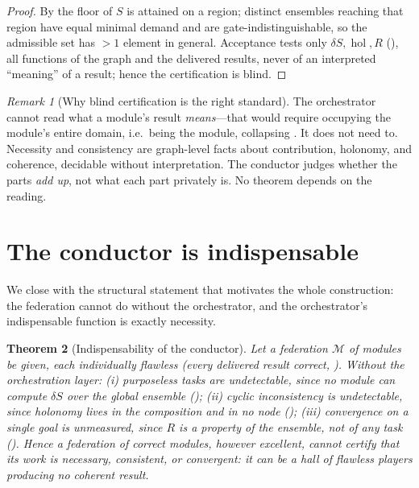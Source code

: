 \documentclass[twocolumn,11pt,a4paper]{article}
\theoremstyle{sup}
\newtheorem{theorem}{Theorem}[section]
\theoremstyle{definition}
\theoremstyle{remark}
\newtheorem{remark}[theorem]{Remark}
\DeclareMathOperator{\hol}{hol}
\newcommand{\Sent}{S}                 %
\newcommand{\mods}{\mathcal{M}}       %
\newcommand{\contrib}{\delta\Sent}    %
\newcommand{\Rens}{R}                 %
\begin{document}
\begin{proof}
By  the floor of $\Sent$ is attained on a region; distinct ensembles
reaching that region have equal minimal demand and are gate-indistinguishable, so
the admissible set has $>1$ element in general. Acceptance tests only
$\contrib,\hol,\Rens$ (), all functions of the graph and
the delivered results, never of an interpreted ``meaning'' of a result; hence the
certification is blind.
\end{proof}

\begin{remark}[Why blind certification is the right standard]
\label{rem:blind}
The orchestrator cannot read what a module's result \emph{means}---that would
require occupying the module's entire domain, i.e.\ being the module, collapsing
. It does not need to. Necessity and consistency are
graph-level facts about contribution, holonomy, and coherence, decidable without
interpretation. The conductor judges whether the parts \emph{add up}, not what each
part privately is. No theorem depends on the reading.
\end{remark}

\section{The conductor is indispensable}
\label{sec:conductor}

We close with the structural statement that motivates the whole construction: the
federation cannot do without the orchestrator, and the orchestrator's
indispensable function is exactly necessity.

\begin{theorem}[Indispensability of the conductor]
\label{thm:indispensable}
Let a federation $\mods$ of modules be given, each individually flawless (every
delivered result correct, ). Without the orchestration layer:
\textup{(i)} purposeless tasks are undetectable, since no module can compute
$\contrib$ over the global ensemble (); \textup{(ii)} cyclic
inconsistency is undetectable, since holonomy lives in the composition and in no
node (); \textup{(iii)} convergence on a single goal is
unmeasured, since $\Rens$ is a property of the ensemble, not of any task
(). Hence a federation of correct modules, however excellent,
cannot certify that its work is necessary, consistent, or convergent: it can be a
hall of flawless players producing no coherent result.
\end{theorem}
\end{document}

